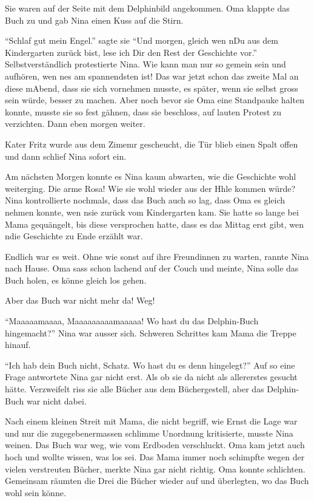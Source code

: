 \begin{mdframed}[style=mystyle]
Sie waren auf der Seite mit dem Delphinbild angekommen. Oma klappte das Buch zu und gab Nina einen Kuss auf die Stirn.

\enquote{Schlaf gut mein Engel.} sagte sie \enquote{Und morgen, gleich wen nDu aus dem Kindergarten zurück bist, lese ich Dir den Rest der Geschichte vor.} Selbstverständlich protestierte Nina. Wie kann man nur so gemein sein und aufhören, wen nes am spannendsten ist! Das war jetzt schon das zweite Mal an diese mAbend, dass sie sich vornehmen musste, es später, wenn sie selbst gross sein würde, besser zu machen. Aber noch bevor sie Oma eine Standpauke halten konnte, musste sie so fest gähnen, dass sie beschloss, auf lauten Protest zu verzichten. Dann eben morgen weiter.

Kater Fritz wurde aus dem Zimemr gescheucht, die Tür blieb einen Spalt offen und dann schlief Nina sofort ein.

Am nächsten Morgen konnte es Nina kaum abwarten, wie die Geschichte wohl weiterging. Die arme Rosa! Wie sie wohl wieder aus der Hhle kommen würde? Nina kontrollierte nochmals, dass das Buch auch so lag, dass Oma es gleich nehmen konnte, wen nsie zurück vom Kindergarten kam. Sie hatte so lange bei Mama gequängelt, bis diese versprochen hatte, dass es das Mittag erst gibt, wen ndie Geschichte zu Ende erzählt war.

Endlich war es weit. Ohne wie sonst auf ihre Freundinnen zu warten, rannte Nina nach Hause. Oma sass schon lachend auf der Couch und meinte, Nina solle das Buch holen, es könne gleich los gehen.

Aber das Buch war nicht mehr da! Weg!

\enquote{Maaaaamaaaa, Maaaaaaaaamaaaaa! Wo hast du das Delphin-Buch hingemacht?} Nina war ausser sich. Schweren Schrittes kam Mama die Treppe hinauf.

\enquote{Ich hab dein Buch nicht, Schatz. Wo hast du es denn hingelegt?} Auf so eine Frage antwortete Nina gar nicht erst. Als ob sie da nicht als allererstes gesucht hätte. Verzweifelt riss sie alle Bücher aus dem Büchergestell, aber das Delphin-Buch war nicht dabei.

Nach einem kleinen Streit mit Mama, die nicht begriff, wie Ernst die Lage war und nur die zugegebenermassen schlimme Unordnung kritisierte, musste Nina weinen. Das Buch war weg, wie vom Erdboden verschluckt. Oma kam jetzt auch hoch und wollte wissen, was los sei. Das Mama immer noch schimpfte wegen der vielen verstreuten Bücher, merkte Nina gar nicht richtig. Oma konnte schlichten. Gemeinsam räumten die Drei die Bücher wieder auf und überlegten, wo das Buch wohl sein könne.


\end{mdframed}
